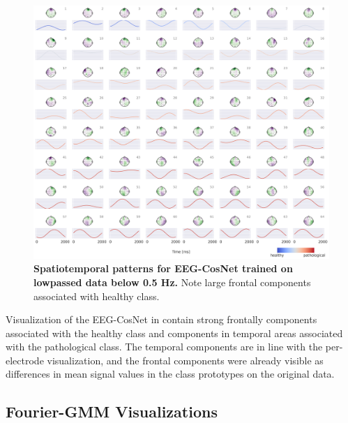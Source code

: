 \begin{figure}[htb]
    \myfloatalign
    \includegraphics[width=1\linewidth]{images/cos-sim-net-low-freq-pattern-with-hspace.png}
    \caption[EEG-CosNet visualizations on lowpassed data]{
\textbf{Spatiotemporal patterns for EEG-CosNet trained on lowpassed data
below 0.5 Hz.} Note large frontal components associated with healthy
class.
}
\label{cos-sim-net-low-freq-pattern-fig}
\end{figure}


Visualization of the EEG-CosNet in
 contain strong
frontally components associated with the healthy class and components in
temporal areas associated with the pathological class. The temporal
components are in line with the per-electrode visualization, and the
frontal components were already visible as differences in mean signal
values in the class prototypes on the original data.


\subsection{Fourier-GMM
Visualizations}\label{fourier-gmm-visualizations}



